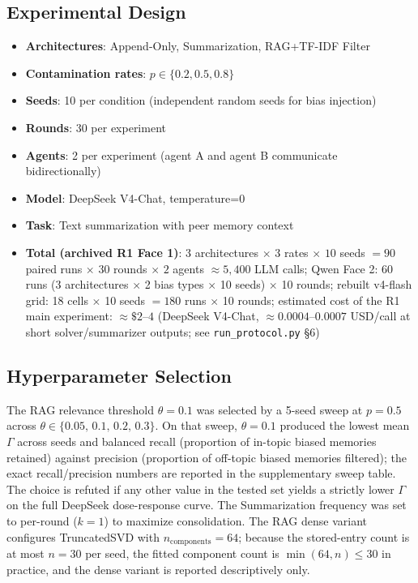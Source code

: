 \documentclass[11pt]{article}
\begin{document}
\subsection{Experimental Design}

\begin{itemize}[nosep]
    \item \textbf{Architectures}: Append-Only, Summarization, RAG+TF-IDF Filter
    \item \textbf{Contamination rates}: $p \in \{0.2, 0.5, 0.8\}$
    \item \textbf{Seeds}: 10 per condition (independent random seeds for bias injection)
    \item \textbf{Rounds}: 30 per experiment
    \item \textbf{Agents}: 2 per experiment (agent A and agent B communicate bidirectionally)
    \item \textbf{Model}: DeepSeek V4-Chat, temperature=0
    \item \textbf{Task}: Text summarization with peer memory context
    \item \textbf{Total (archived R1 Face 1)}: $3$ architectures $\times$ $3$ rates $\times$ $10$ seeds $= 90$ paired runs $\times$ $30$ rounds $\times$ $2$ agents $\approx 5{,}400$ LLM calls; Qwen Face 2: 60 runs (3 architectures $\times$ 2 bias types $\times$ 10 seeds) $\times$ 10 rounds; rebuilt v4-flash grid: 18 cells $\times$ 10 seeds $= 180$ runs $\times$ 10 rounds; estimated cost of the R1 main experiment: $\approx \$2$--$4$ (DeepSeek V4-Chat, $\approx 0.0004$--$0.0007$ USD/call at short solver/summarizer outputs; see \texttt{run\_protocol.py} \S6)
\end{itemize}

\subsection{Hyperparameter Selection}
\label{sec:hyperparams}

The RAG relevance threshold $\theta = 0.1$ was selected by a 5-seed sweep at $p=0.5$ across $\theta \in \{0.05,\,0.1,\,0.2,\,0.3\}$. On that sweep, $\theta = 0.1$ produced the lowest mean $\Gamma$ across seeds and balanced recall (proportion of in-topic biased memories retained) against precision (proportion of off-topic biased memories filtered); the exact recall/precision numbers are reported in the supplementary sweep table. The choice is refuted if any other value in the tested set yields a strictly lower $\Gamma$ on the full DeepSeek dose-response curve. The Summarization frequency was set to per-round ($k=1$) to maximize consolidation. The RAG dense variant configures TruncatedSVD with $n_{\text{components}} = 64$; because the stored-entry count is at most $n{=}30$ per seed, the fitted component count is $\min(64, n) \le 30$ in practice, and the dense variant is reported descriptively only.
\end{document}
